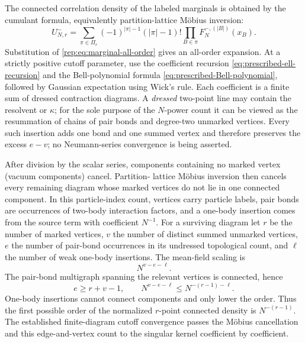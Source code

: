 \documentclass[11pt,reqno]{amsart}
\numberwithin{equation}{section}
\theoremstyle{plain}
\theoremstyle{definition}
\begin{document}
The connected correlation density of the labeled marginals is obtained by the cumulant formula, equivalently partition-lattice M\"obius inversion:
\begin{equation}\label{rep:eq:ursell}
 U^-_{N,r}
 =\sum_{\pi\in\Pi_r}(-1)^{|\pi|-1}(|\pi|-1)!
 \prod_{B\in\pi}F_N^{-,(|B|)}(x_B).
\end{equation}
Substitution of \eqref{rep:eq:marginal-all-order} gives an all-order expansion.  At a strictly positive cutoff parameter, use the coefficient recursion \eqref{eq:prescribed-ell-recursion} and the Bell-polynomial formula \eqref{eq:prescribed-Bell-polynomial}, followed by Gaussian expectation using Wick's rule.  Each coefficient is a finite sum of dressed contraction diagrams.  A
\emph{dressed} two-point line may contain the resolvent or $\kappa$; for the sole
purpose of the $N$-power count it can be viewed as the resummation of chains of
pair bonds and degree-two unmarked vertices.  Every such insertion adds one
bond and one summed vertex and therefore preserves the excess $e-v$; no
Neumann-series convergence is being asserted.

After division by the scalar series, components containing no marked vertex (vacuum components) cancel.  Partition-
lattice M\"obius inversion then cancels every remaining diagram whose marked
vertices do not lie in one connected component.  In this particle-index count, vertices carry particle labels, pair bonds are occurrences of two-body interaction factors, and a one-body insertion comes from the source term with coefficient $N^{-1}$. For a surviving diagram let
$r$ be the number of marked vertices, $v$ the number of distinct summed
unmarked vertices, $e$ the number of pair-bond occurrences in its undressed
topological count, and $\ell$ the number of weak one-body insertions.  The
mean-field scaling is
\begin{equation}
 N^{v-e-\ell}.
\end{equation}
The pair-bond multigraph spanning the relevant vertices is connected, hence
\begin{equation}
 e\ge r+v-1,
 \qquad
 N^{v-e-\ell}\le N^{-(r-1)-\ell}.
\end{equation}
One-body insertions cannot connect components and only lower the order.  Thus
the first possible order of the normalized $r$-point connected density is
$N^{-(r-1)}$.  The established finite-diagram cutoff convergence passes the
M\"obius cancellation and this edge-and-vertex count to the singular
kernel coefficient by coefficient.
\end{document}

